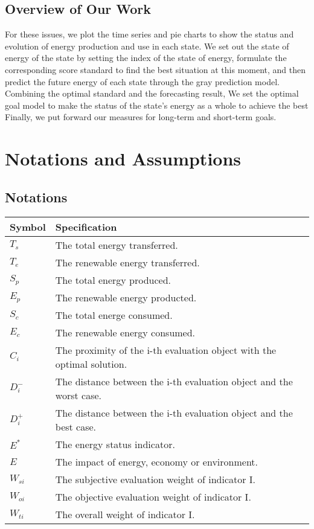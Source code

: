 \documentclass{mcmthesis}
\begin{document}
\subsection{Overview of Our Work}
For these issues, we plot the time series and pie charts to show the status and evolution of energy production and use in each state. We set out the state of energy of the state by setting the index of the state of energy, formulate the corresponding score standard to find the best situation at this moment, and then predict the future energy of each state through the gray prediction model. Combining the optimal standard and the forecasting result, We set the optimal goal model to make the status of the state's energy as a whole to achieve the best Finally, we put forward our measures for long-term and short-term goals.

\section{Notations and Assumptions}
\subsection{Notations}
\begin{table}[H]
  \centering
  \begin{tabular}{ll}
    \toprule
    Symbol & Specification \\
    \toprule
    $T_s$  &  The total energy transferred. \\
    $T_e$  &  The renewable energy transferred.\\
    $S_p$  &  The total energy produced.\\
    $E_p$  &  The renewable energy producted.\\
    $S_c$  &  The total energe consumed.\\
    $E_c$  &  The renewable energy consumed.\\
    $C_i$  &  The proximity of the i-th evaluation object with the optimal solution.\\
    $D^-_i$  &  The distance between the i-th evaluation object and the worst case.\\
    $D^+_i$  &  The distance between the i-th evaluation object and the best case.\\
    $E^*$  &  The energy status indicator.\\
    $E$    &  The impact of energy, economy or environment.\\
    $W_{si}$  &  The subjective evaluation weight of indicator I.\\
    $W_{oi}$  &  The objective evaluation weight of indicator I.\\
    $W_{ti}$  &  The overall weight of indicator I.\\    

    \bottomrule
  \end{tabular}
\end{table}
\end{document}
